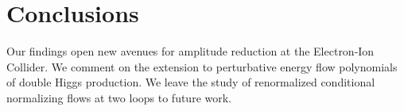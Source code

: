 \section{Conclusions}\label{sec:conclusions}

Our findings open new avenues for amplitude reduction at the
Electron-Ion Collider. We comment on the extension to perturbative
energy flow polynomials of double Higgs production. We leave the study
of renormalized conditional normalizing flows at two loops to future
work.

